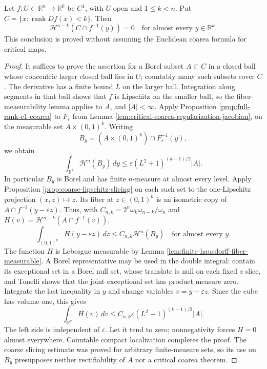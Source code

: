\begin{proposition}\label{prop:c1-critical-fibers-null}
Let $f:U\subset\mathbb R^n\to\mathbb R^k$ be $C^1$, with $U$ open and $1\leq k<n$. Put $C=\{x:\operatorname{rank}Df(x)<k\}$. Then
\[
 \mathcal H^{n-k}(C\cap f^{-1}(y))=0
 \quad\text{for almost every }y\in\mathbb R^k.
\]
This conclusion is proved without assuming the Euclidean coarea formula for critical maps.
\end{proposition}
\begin{proof}
It suffices to prove the assertion for a Borel subset $A\subset C$ in a closed ball whose concentric larger closed ball lies in $U$; countably many such subsets cover $C$. The derivative has a finite bound $L$ on the larger ball. Integration along segments in that ball shows that $f$ is Lipschitz on the smaller ball, so the fiber-measurability lemma applies to $A$, and $|A|<\infty$. Apply Proposition \ref{prop:full-rank-c1-coarea} to $F_\varepsilon$ from Lemma \ref{lem:critical-coarea-regularization-jacobian}, on the measurable set $A\times(0,1)^k$. Writing
\[
 B_y=(A\times(0,1)^k)\cap F_\varepsilon^{-1}(y),
\]
we obtain
\[
 \int_{\mathbb R^k}\mathcal H^n(B_y)\,dy
 \leq\varepsilon(L^2+1)^{(k-1)/2}|A|.
\]
In particular $B_y$ is Borel and has finite $n$-measure at almost every level. Apply Proposition \ref{prop:coarse-lipschitz-slicing} on each such set to the one-Lipschitz projection $(x,z)\mapsto z$. Its fiber at $z\in(0,1)^k$ is an isometric copy of $A\cap f^{-1}(y-\varepsilon z)$. Thus, with $C_{n,k}=2^n\omega_k\omega_{n-k}/\omega_n$ and $H(v)=\mathcal H^{n-k}(A\cap f^{-1}(v))$,
\[
 \int_{(0,1)^k}H(y-\varepsilon z)\,dz
 \leq C_{n,k}\mathcal H^n(B_y)
 \quad\text{for almost every }y.
\]
The function $H$ is Lebesgue measurable by Lemma \ref{lem:finite-hausdorff-fiber-measurable}. A Borel representative may be used in the double integral: contain its exceptional set in a Borel null set, whose translate is null on each fixed $z$ slice, and Tonelli shows that the joint exceptional set has product measure zero. Integrate the last inequality in $y$ and change variables $v=y-\varepsilon z$. Since the cube has volume one, this gives
\[
 \int_{\mathbb R^k}H(v)\,dv
 \leq C_{n,k}\varepsilon(L^2+1)^{(k-1)/2}|A|.
\]
The left side is independent of $\varepsilon$. Let it tend to zero; nonnegativity forces $H=0$ almost everywhere. Countable compact localization completes the proof. The coarse slicing estimate was proved for arbitrary finite-measure sets, so its use on $B_y$ presupposes neither rectifiability of $A$ nor a critical coarea theorem.
\end{proof}

